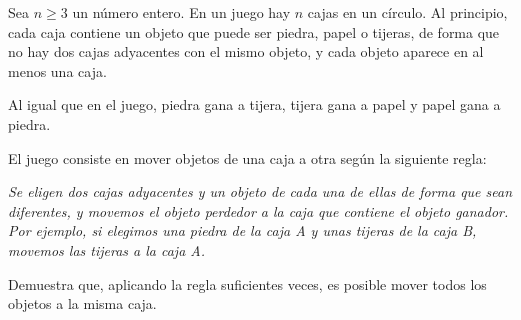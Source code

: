 Sea $n\ge 3$ un número entero. En un juego hay $n$ cajas en un círculo. Al principio, cada caja contiene un objeto que puede ser piedra, papel o tijeras, de forma que no hay dos cajas adyacentes con el mismo objeto, y cada objeto aparece en al menos una caja. 

Al igual que en el juego, piedra gana a tijera, tijera gana a papel y papel gana a piedra. 

El juego consiste en mover objetos de una caja a otra según la siguiente regla: 

\textit{ Se eligen dos cajas adyacentes y un objeto de cada una de ellas de forma que sean diferentes, y movemos el objeto perdedor a la caja que contiene el objeto ganador. Por ejemplo, si elegimos una piedra de la caja A y unas tijeras de la caja B, movemos las tijeras a la caja A.}

Demuestra que, aplicando la regla suficientes veces, es posible mover todos los objetos a la misma caja.
